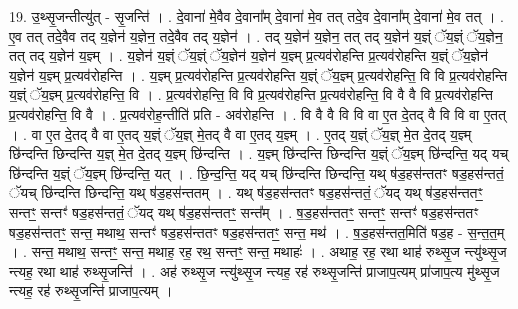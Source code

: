 \documentclass[17pt]{extarticle}
\begin{document}
19. उ॒थ्सृ॒जन्तीत्यु॑त् - सृ॒जन्ति॑ । . दे॒वाना॑ मे॒वैव दे॒वाना᳚म् दे॒वाना॑ मे॒व तत् तदे॒व दे॒वाना᳚म् दे॒वाना॑ मे॒व तत् । . ए॒व तत् तदे॒वैव तद् य॒ज्ञेन॑ य॒ज्ञेन॒ तदे॒वैव तद् य॒ज्ञेन॑ । . तद् य॒ज्ञेन॑ य॒ज्ञेन॒ तत् तद् य॒ज्ञेन॑ य॒ज्ञ्ं ॅय॒ज्ञ्ं ॅय॒ज्ञेन॒ तत् तद् य॒ज्ञेन॑ य॒ज्ञ्म् । . य॒ज्ञेन॑ य॒ज्ञ्ं ॅय॒ज्ञ्ं ॅय॒ज्ञेन॑ य॒ज्ञेन॑ य॒ज्ञ्म् प्र॒त्यव॑रोहन्ति प्र॒त्यव॑रोहन्ति य॒ज्ञ्ं ॅय॒ज्ञेन॑ य॒ज्ञेन॑ य॒ज्ञ्म् प्र॒त्यव॑रोहन्ति । . य॒ज्ञ्म् प्र॒त्यव॑रोहन्ति प्र॒त्यव॑रोहन्ति य॒ज्ञ्ं ॅय॒ज्ञ्म् प्र॒त्यव॑रोहन्ति॒ वि वि प्र॒त्यव॑रोहन्ति य॒ज्ञ्ं ॅय॒ज्ञ्म् प्र॒त्यव॑रोहन्ति॒ वि । . प्र॒त्यव॑रोहन्ति॒ वि वि प्र॒त्यव॑रोहन्ति प्र॒त्यव॑रोहन्ति॒ वि वै वै वि प्र॒त्यव॑रोहन्ति प्र॒त्यव॑रोहन्ति॒ वि वै । . प्र॒त्यव॑रोह॒न्तीति॑ प्रति - अव॑रोहन्ति । . वि वै वै वि वि वा ए॒त दे॒तद् वै वि वि वा ए॒तत् । . वा ए॒त दे॒तद् वै वा ए॒तद् य॒ज्ञ्ं ॅय॒ज्ञ् मे॒तद् वै वा ए॒तद् य॒ज्ञ्म् । . ए॒तद् य॒ज्ञ्ं ॅय॒ज्ञ् मे॒त दे॒तद् य॒ज्ञ्म् छि॑न्दन्ति छिन्दन्ति य॒ज्ञ् मे॒त दे॒तद् य॒ज्ञ्म् छि॑न्दन्ति । . य॒ज्ञ्म् छि॑न्दन्ति छिन्दन्ति य॒ज्ञ्ं ॅय॒ज्ञ्म् छि॑न्दन्ति॒ यद् यच् छि॑न्दन्ति य॒ज्ञ्ं ॅय॒ज्ञ्म् छि॑न्दन्ति॒ यत् । . छि॒न्द॒न्ति॒ यद् यच् छि॑न्दन्ति छिन्दन्ति॒ यथ् ष॑ड॒हस॑न्ततꣳ षड॒हस॑न्ततं॒ ॅयच् छि॑न्दन्ति छिन्दन्ति॒ यथ् ष॑ड॒हस॑न्ततम् । . यथ् ष॑ड॒हस॑न्ततꣳ षड॒हस॑न्ततं॒ ॅयद् यथ् ष॑ड॒हस॑न्ततꣳ॒॒ सन्तꣳ॒॒ सन्तꣳ॑ षड॒हस॑न्ततं॒ ॅयद् यथ् ष॑ड॒हस॑न्ततꣳ॒॒ सन्त᳚म् । . ष॒ड॒हस॑न्ततꣳ॒॒ सन्तꣳ॒॒ सन्तꣳ॑ षड॒हस॑न्ततꣳ षड॒हस॑न्ततꣳ॒॒ सन्त॒ मथाथ॒ सन्तꣳ॑ षड॒हस॑न्ततꣳ षड॒हस॑न्ततꣳ॒॒ सन्त॒ मथ॑ । . ष॒ड॒हस॑न्तत॒मिति॑ षड॒ह - स॒न्त॒त॒म् । . सन्त॒ मथाथ॒ सन्तꣳ॒॒ सन्त॒ मथाह॒ रह॒ रथ॒ सन्तꣳ॒॒ सन्त॒ मथाहः॑ । . अथाह॒ रह॒ रथा थाह॑ रुथ्सृ॒ज न्त्यु॑थ्सृ॒ज न्त्यह॒ रथा थाह॑ रुथ्सृ॒जन्ति॑ । . अह॑ रुथ्सृ॒ज न्त्यु॑थ्सृ॒ज न्त्यह॒ रह॑ रुथ्सृ॒जन्ति॑ प्राजाप॒त्यम् प्रा॑जाप॒त्य मु॑थ्सृ॒ज न्त्यह॒ रह॑ रुथ्सृ॒जन्ति॑ प्राजाप॒त्यम् । \newline
\end{document}
